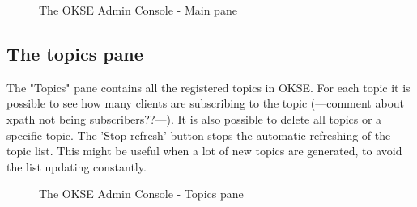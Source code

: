 \begin{center}
  \begin{figure}[ht!]
    \caption{The OKSE Admin Console - Main pane} 
    \label{fig:OKSE Admin Console - Main pane}
  \end{figure}
\end{center}

\subsection{The topics pane}
The "Topics" pane contains all the registered topics in OKSE. For each topic it is possible to see how many clients are subscribing to the topic (---comment about xpath not being subscribers??---). It is also possible to delete all topics or a specific topic. The 'Stop refresh'-button stops the automatic refreshing of the topic list. This might be useful when a lot of new topics are generated, to avoid the list updating constantly.

\begin{center}
  \begin{figure}[ht!]
    \caption{The OKSE Admin Console - Topics pane} 
    \label{fig:OKSE Admin Console - Topics pane}
  \end{figure}
\end{center}

